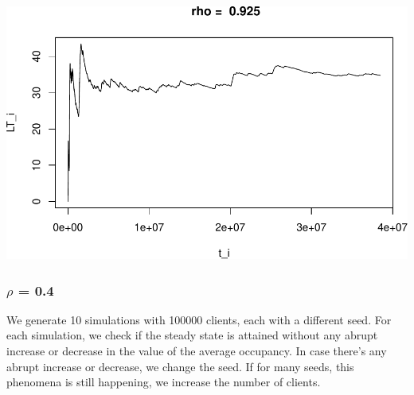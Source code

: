 \documentclass[]{article}
\begin{document}
\includegraphics{003_files/figure-latex/unnamed-chunk-11-4.pdf}

\subsubsection{\texorpdfstring{\(\rho\) =
0.4}{\textbackslash{}rho = 0.4}}\label{rho-0.4}

We generate 10 simulations with 100000 clients, each with a different
seed. For each simulation, we check if the steady state is attained
without any abrupt increase or decrease in the value of the average
occupancy. In case there's any abrupt increase or decrease, we change
the seed. If for many seeds, this phenomena is still happening, we
increase the number of clients.
\end{document}
